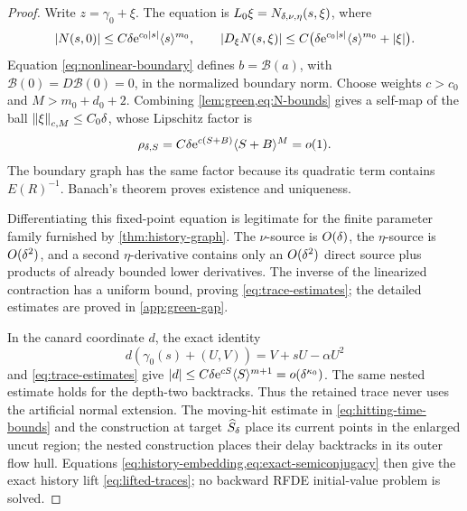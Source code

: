 \begin{proof}
Write \(z=\gamma_0+\xi\).  The equation is
\(L_0\xi=N_{\delta,\nu,\eta}(s,\xi)\), where
\begin{equation}
\label{eq:N-bounds}
 |N(s,0)|\le C\delta\mathrm e^{c_0|s|}\langle s\rangle^{m_0},
 \qquad
 |D_\xi N(s,\xi)|\le
 C\bigl(\delta\mathrm e^{c_0|s|}\langle s\rangle^{m_0}+|\xi|\bigr).
\end{equation}
Equation \cref{eq:nonlinear-boundary} defines
\(b=\mathcal B(a)\), with
\(\mathcal B(0)=D\mathcal B(0)=0\), in the normalized boundary norm.
Choose weights \(c>c_0\) and \(M>m_0+d_0+2\).  Combining
\cref{lem:green,eq:N-bounds} gives a self-map of the ball
\(\left\lVert \xi\right\rVert_{c,M}\le C_0\delta\), whose Lipschitz factor is
\begin{equation}
\label{eq:trace-contraction-factor}
 \rho_{\delta,S}=C\delta\mathrm e^{c(S+B)}\langle S+B\rangle^M=o(1).
\end{equation}
The boundary graph has the same factor because its quadratic term contains
\(E(R)^{-1}\).  Banach's theorem proves existence and uniqueness.

Differentiating this fixed-point equation is legitimate for the finite
parameter family furnished by \cref{thm:history-graph}.  The \(\nu\)-source
is \(O(\delta)\), the \(\eta\)-source is \(O(\delta^2)\), and a second
\(\eta\)-derivative contains only an \(O(\delta^2)\) direct source plus
products of already bounded lower derivatives.  The inverse of the
linearized contraction has a uniform bound, proving
\cref{eq:trace-estimates}; the detailed estimates are proved in
\cref{app:green-gap}.

In the canard coordinate \(d\), the exact identity
\begin{equation}
\label{eq:normal-bootstrap}
 d(\gamma_0(s)+(U,V))=V+sU-\alpha U^2
\end{equation}
and \cref{eq:trace-estimates} give
\(|d|\le C\delta\mathrm e^{cS}\langle S\rangle^{m+1}
=o(\delta^{\kappa_0})\).  The same nested estimate holds for the depth-two
backtracks.  Thus the retained trace never uses the artificial normal
extension.  The moving-hit estimate in \cref{eq:hitting-time-bounds} and
the construction at target \(\widehat S_\delta\) place its current points in the
enlarged uncut region; the nested construction places their delay
backtracks in its outer flow hull.  Equations
\cref{eq:history-embedding,eq:exact-semiconjugacy} then give the exact
history lift \cref{eq:lifted-traces}; no backward RFDE initial-value problem
is solved.
\end{proof}

